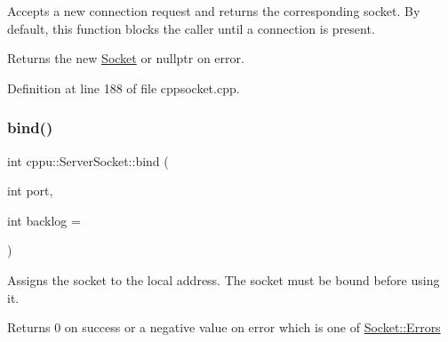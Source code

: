 Accepts a new connection request and returns the corresponding socket. By default, this function blocks the caller until a connection is present. 

\begin{DoxyReturn}{Returns}
the new \mbox{\hyperlink{classcppu_1_1_socket}{Socket}} or nullptr on error. 
\end{DoxyReturn}


Definition at line 188 of file cppsocket.\+cpp.


\begin{DoxyCode}{0}

\end{DoxyCode}
\mbox{\label{classcppu_1_1_server_socket_a255dfdccba51c7cdbcb6733c6c3f6ffa}} 
\subsubsection{\texorpdfstring{bind()}{bind()}}
{\footnotesize\ttfamily int cppu\+::\+Server\+Socket\+::bind (\begin{DoxyParamCaption}\item[{int}]{port,  }\item[{int}]{backlog = {} }\end{DoxyParamCaption})\hspace{0.3cm}{\ttfamily [virtual]}}



Assigns the socket to the local address. The socket must be bound before using it. 

\begin{DoxyReturn}{Returns}
0 on success or a negative value on error which is one of \mbox{\hyperlink{classcppu_1_1_socket_a49ea5cb079bd7ae97ecf7eb30c9d9e5f}{Socket\+::\+Errors}} 
\end{DoxyReturn}


